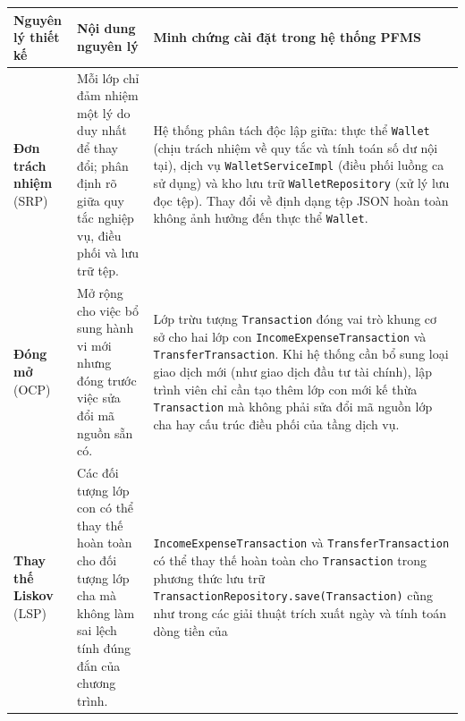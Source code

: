 \documentclass[a4paper,12pt]{report}
\newcommand{\passthrough}[1]{#1}
\newcounter{none}
\begin{document}
{\def\LTcaptype{none} %
\begin{longtable}[]{@{}
  >{\raggedright\arraybackslash}p{}
  >{\raggedright\arraybackslash}p{}
  >{\raggedright\arraybackslash}p{}@{}}
\toprule\noalign{}
\begin{minipage}[b]{\linewidth}\raggedright
Nguyên lý thiết kế
\end{minipage} & \begin{minipage}[b]{\linewidth}\raggedright
Nội dung nguyên lý
\end{minipage} & \begin{minipage}[b]{\linewidth}\raggedright
Minh chứng cài đặt trong hệ thống PFMS
\end{minipage} \\
\midrule\noalign{}
\endhead
\bottomrule\noalign{}
\endlastfoot
\textbf{Đơn trách nhiệm} (SRP) & Mỗi lớp chỉ đảm nhiệm một lý do duy
nhất để thay đổi; phân định rõ giữa quy tắc nghiệp vụ, điều phối và lưu
trữ tệp. & Hệ thống phân tách độc lập giữa: thực thể
\passthrough{\lstinline!Wallet!} (chịu trách nhiệm về quy tắc và tính
toán số dư nội tại), dịch vụ \passthrough{\lstinline!WalletServiceImpl!}
(điều phối luồng ca sử dụng) và kho lưu trữ
\passthrough{\lstinline!WalletRepository!} (xử lý lưu đọc tệp). Thay đổi
về định dạng tệp JSON hoàn toàn không ảnh hưởng đến thực thể
\passthrough{\lstinline!Wallet!}. \\
\textbf{Đóng mở} (OCP) & Mở rộng cho việc bổ sung hành vi mới nhưng đóng
trước việc sửa đổi mã nguồn sẵn có. & Lớp trừu tượng
\passthrough{\lstinline!Transaction!} đóng vai trò khung cơ sở cho hai
lớp con \passthrough{\lstinline!IncomeExpenseTransaction!} và
\passthrough{\lstinline!TransferTransaction!}. Khi hệ thống cần bổ sung
loại giao dịch mới (như giao dịch đầu tư tài chính), lập trình viên chỉ
cần tạo thêm lớp con mới kế thừa \passthrough{\lstinline!Transaction!}
mà không phải sửa đổi mã nguồn lớp cha hay cấu trúc điều phối của tầng
dịch vụ. \\
\textbf{Thay thế Liskov} (LSP) & Các đối tượng lớp con có thể thay thế
hoàn toàn cho đối tượng lớp cha mà không làm sai lệch tính đúng đắn của
chương trình. & \passthrough{\lstinline!IncomeExpenseTransaction!} và
\passthrough{\lstinline!TransferTransaction!} có thể thay thế hoàn toàn
cho \passthrough{\lstinline!Transaction!} trong phương thức lưu trữ
\passthrough{\lstinline!TransactionRepository.save(Transaction)!} cũng
như trong các giải thuật trích xuất ngày và tính toán dòng tiền của

\end{longtable}}
\end{document}
